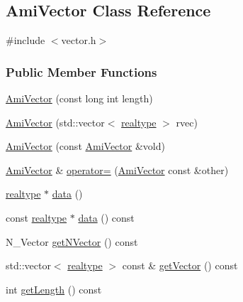 \hypertarget{classamici_1_1_ami_vector}{}\subsection{Ami\+Vector Class Reference}
\label{classamici_1_1_ami_vector}


{\ttfamily \#include $<$vector.\+h$>$}

\subsubsection*{Public Member Functions}
\begin{DoxyCompactItemize}
\item 
\mbox{\hyperlink{classamici_1_1_ami_vector_a843c8e8dfc2642218e9f42d86d42c28c}{Ami\+Vector}} (const long int length)
\item 
\mbox{\hyperlink{classamici_1_1_ami_vector_a8ef9433b11b0d14c32e2e4ce18fe055e}{Ami\+Vector}} (std\+::vector$<$ \mbox{\hyperlink{namespaceamici_a1bdce28051d6a53868f7ccbf5f2c14a3}{realtype}} $>$ rvec)
\item 
\mbox{\hyperlink{classamici_1_1_ami_vector_a3202c4cf34466ec28baece9cf1eae880}{Ami\+Vector}} (const \mbox{\hyperlink{classamici_1_1_ami_vector}{Ami\+Vector}} \&vold)
\item 
\mbox{\hyperlink{classamici_1_1_ami_vector}{Ami\+Vector}} \& \mbox{\hyperlink{classamici_1_1_ami_vector_a6e52c4d61a7ea2d5bfb2f797aa8041ec}{operator=}} (\mbox{\hyperlink{classamici_1_1_ami_vector}{Ami\+Vector}} const \&other)
\item 
\mbox{\hyperlink{namespaceamici_a1bdce28051d6a53868f7ccbf5f2c14a3}{realtype}} $\ast$ \mbox{\hyperlink{classamici_1_1_ami_vector_aee17a5447b8e03180f89a2a8acbd572f}{data}} ()
\item 
const \mbox{\hyperlink{namespaceamici_a1bdce28051d6a53868f7ccbf5f2c14a3}{realtype}} $\ast$ \mbox{\hyperlink{classamici_1_1_ami_vector_a8045bd641b2f456cdbf99d0c12bb9218}{data}} () const
\item 
N\+\_\+\+Vector \mbox{\hyperlink{classamici_1_1_ami_vector_acf288b105b2fa4520d0d73f828687533}{get\+N\+Vector}} () const
\item 
std\+::vector$<$ \mbox{\hyperlink{namespaceamici_a1bdce28051d6a53868f7ccbf5f2c14a3}{realtype}} $>$ const  \& \mbox{\hyperlink{classamici_1_1_ami_vector_a5f73cf1c7b6769c44dfb51b048ec4d63}{get\+Vector}} () const
\item 
int \mbox{\hyperlink{classamici_1_1_ami_vector_a5f00d4dc3e7866d193ce926f35542801}{get\+Length}} () const

\end{DoxyCompactItemize}
